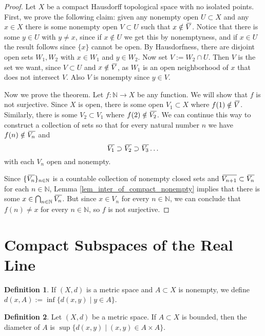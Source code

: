\documentclass{report}
\theoremstyle{definition}
\newtheorem{definition}{Definition}[section]
\theoremstyle{remark}
\newcommand{\N}{\mathbb{N}}
\newcommand{\set}[1]{\{#1\}}
\newcommand{\closure}[2][3]{%
{}\mkern#1mu\overline{\mkern-#1mu#2}}
\begin{document}
\begin{proof}
    Let $X$ be a compact Hausdorff topological space with no isolated points. First, we prove the following claim: given any nonempty open $U \subset X$ and any $x \in X$ there is some nonempty open $V \subset U$ such that $x \notin \closure{V}$. Notice that there is some $y \in U$ with $y \neq x$, since if $x \notin U$ we get this by nonemptyness, and if $x \in U$ the result follows since $\set{x}$ cannot be open. By Hausdorfness, there are disjoint open sets $W_1, W_2$ with $x \in W_1$ and $y \in W_2$. Now set $V := W_2 \cap U$. Then $V$ is the set we want, since $V \subset U$ and $x \notin \closure{V}$, as $W_1$ is an open neighborhood of $x$ that does not intersect $V$. Also $V$ is nonempty since $y \in V$.
    
    Now we prove the theorem. Let $f : \N \to X$ be any function. We will show that $f$ is not surjective. Since $X$ is open, there is some open $V_1 \subset X$ where $f(1) \notin \closure{V}$. Similarly, there is some $V_2 \subset V_1$ where $f(2) \notin \closure{V_2}$. We can continue this way to construct a collection of sets so that for every natural number $n$ we have $f(n) \notin \closure{V_n}$ and 
    \begin{equation*}
        \closure{V_1} \supset \closure{V_2} \supset \closure{V_3} \dots
    \end{equation*} with each $V_n$ open and nonempty.
    
    Since $\set{\closure{V_n}}_{n \in \N}$ is a countable collection of nonempty closed sets and $\closure{V_{n+1}} \subset \closure{V_n}$ for each $n \in \N$, Lemma \ref{lem_inter_of_compact_nonempty} implies that there is some $x \in \bigcap_{n \in \N} \closure{V_n}$. But since $x \in V_n$ for every $n \in \N$, we can conclude that $f(n) \neq x$ for every $n \in \N$, so $f$ is not surjective.
\end{proof}

\section{Compact Subspaces of the Real Line}

\begin{definition}
   If $(X, d)$ is a metric space and $A \subset X$ is nonempty, we define $d(x, A) := \inf\set{d(x, y) \mid y \in A}$.
\end{definition}

\begin{definition}
   Let $(X, d)$ be a metric space. If $A \subset X$ is bounded, then the diameter of $A$ is $\sup\set{d(x, y) \mid (x, y) \in A \times A}$.
\end{definition}
\end{document}
